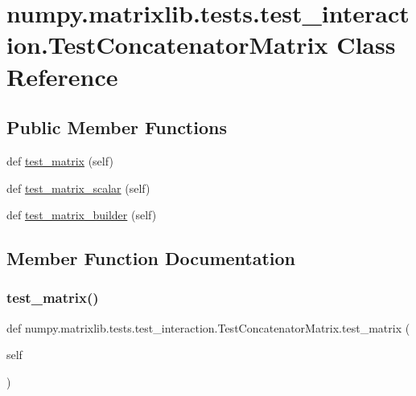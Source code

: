 \hypertarget{classnumpy_1_1matrixlib_1_1tests_1_1test__interaction_1_1TestConcatenatorMatrix}{}\section{numpy.\+matrixlib.\+tests.\+test\+\_\+interaction.\+Test\+Concatenator\+Matrix Class Reference}
\label{classnumpy_1_1matrixlib_1_1tests_1_1test__interaction_1_1TestConcatenatorMatrix}
\subsection*{Public Member Functions}
\begin{DoxyCompactItemize}
\item 
def \hyperlink{classnumpy_1_1matrixlib_1_1tests_1_1test__interaction_1_1TestConcatenatorMatrix_aa9534a91216cd44e599d97d0ac4ae7f5}{test\+\_\+matrix} (self)
\item 
def \hyperlink{classnumpy_1_1matrixlib_1_1tests_1_1test__interaction_1_1TestConcatenatorMatrix_a910f4ec5c6599e309b4f869619395d70}{test\+\_\+matrix\+\_\+scalar} (self)
\item 
def \hyperlink{classnumpy_1_1matrixlib_1_1tests_1_1test__interaction_1_1TestConcatenatorMatrix_a12321425a3bc3ddb1bef9a33b6539787}{test\+\_\+matrix\+\_\+builder} (self)
\end{DoxyCompactItemize}


\subsection{Member Function Documentation}
\mbox{\label{classnumpy_1_1matrixlib_1_1tests_1_1test__interaction_1_1TestConcatenatorMatrix_aa9534a91216cd44e599d97d0ac4ae7f5}} 
\subsubsection{\texorpdfstring{test\+\_\+matrix()}{test\_matrix()}}
{\footnotesize\ttfamily def numpy.\+matrixlib.\+tests.\+test\+\_\+interaction.\+Test\+Concatenator\+Matrix.\+test\+\_\+matrix (\begin{DoxyParamCaption}\item[{}]{self }\end{DoxyParamCaption})}


